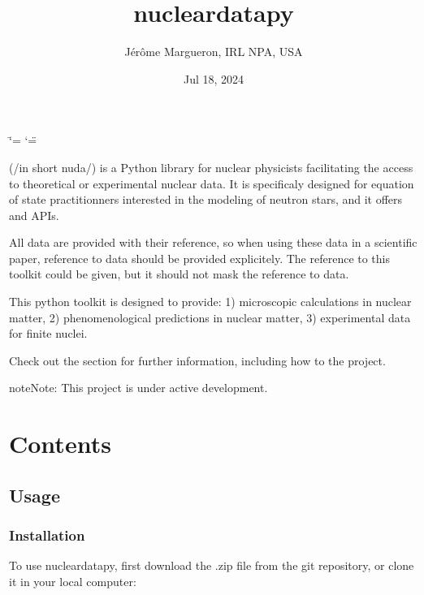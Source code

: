 \documentclass[letterpaper,10pt,english]{sphinxmanual}
\title{nucleardatapy}
\date{Jul 18, 2024}
\author{Jérôme Margueron, IRL NPA, USA}
\begin{document}
\ifdefined\shorthandoff
  \ifnum\catcode`\=\string=\active\shorthandoff{=}\fi
  \ifnum\catcode`\"=\active{}\fi
\fi

\pagestyle{empty}
\sphinxmaketitle
\pagestyle{plain}
\sphinxtableofcontents
\pagestyle{normal}
\label{\detokenize{index::doc}}


\sphinxAtStartPar
{} (/in short nuda/) is a Python library for nuclear physicists facilitating the access to theoretical or experimental nuclear data. It is specificaly designed for equation of state practitionners interested in the modeling of neutron stars, and it offers  and  APIs.

\sphinxAtStartPar
All data are provided with their reference, so when using these data in a scientific paper, reference to data should be provided explicitely. The reference to this toolkit could be given, but it should not mask the reference to data.

\sphinxAtStartPar
This python toolkit is designed to provide:
1) microscopic calculations in nuclear matter,
2) phenomenological predictions in nuclear matter,
3) experimental data for finite nuclei.

\sphinxAtStartPar
Check out the {\hyperref[\detokenize{source/usage::doc}]{}} section for further information, including how to
{\hyperref[\detokenize{source/usage:installation}]{}} the project.

\begin{sphinxadmonition}{note}{Note:}
\sphinxAtStartPar
This project is under active development.
\end{sphinxadmonition}


\chapter{Contents}
\label{\detokenize{index:contents}}
\sphinxstepscope


\section{Usage}
\label{\detokenize{source/usage:usage}}\label{\detokenize{source/usage::doc}}

\subsection{Installation}
\label{\detokenize{source/usage:installation}}\label{\detokenize{source/usage:id1}}
\sphinxAtStartPar
To use nucleardatapy, first download the .zip file from the git repository, or clone it in your local computer:
\end{document}
